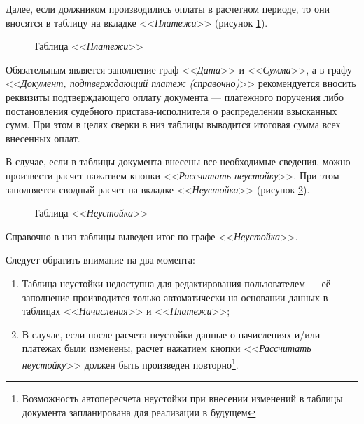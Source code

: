 \documentclass[a4paper,12pt,draft]{article}
\begin{document}
Далее, если должником производились оплаты в расчетном периоде, то они вносятся в таблицу на вкладке <<{\it Платежи}>> (рисунок \ref{ris:opl}).
\begin{figure}[h]
\caption{Таблица <<{\it Платежи}>>}
\label{ris:opl}
\end{figure}

Обязательным является заполнение граф <<{\it Дата}>> и <<{\it Сумма}>>, а в графу <<{\it Документ, подтверждающий платеж (справочно)}>> рекомендуется вносить реквизиты подтверждающего оплату документа --- платежного поручения либо постановления судебного пристава-исполнителя о распределении взысканных сумм. При этом в целях сверки в низ таблицы выводится итоговая сумма всех внесенных оплат.

В случае, если в таблицы документа внесены все необходимые сведения, можно произвести расчет нажатием кнопки <<{\it Рассчитать неустойку}>>. При этом заполняется сводный расчет на вкладке <<{\it Неустойка}>> (рисунок \ref{ris:itog}).

\begin{figure}[h]
\caption{Таблица <<{\it Неустойка}>>}
\label{ris:itog}
\end{figure}

Справочно в низ таблицы выведен итог по графе <<{\it Неустойка}>>.

Следует обратить внимание на два момента:
\begin{enumerate}
\item Таблица неустойки недоступна для редактирования пользователем --- её заполнение производится только автоматически на основании данных в таблицах <<{\it Начисления}>> и <<{\it Платежи}>>;
\item В случае, если после расчета неустойки данные о начислениях и/или платежах были изменены, расчет нажатием кнопки <<{\it Рассчитать неустойку}>> должен быть произведен повторно\footnote{Возможность автопересчета неустойки при внесении изменений в таблицы документа запланирована для реализации в будущем}.
\end{enumerate}
\end{document}
